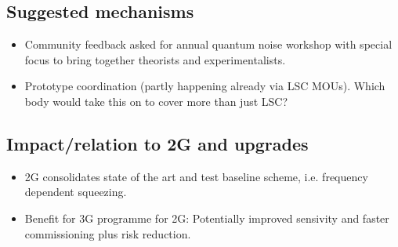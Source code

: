 \subsection{Suggested mechanisms}
\begin{itemize}
\item Community feedback asked for annual quantum noise workshop with special focus to bring together theorists and experimentalists. 
\item Prototype coordination (partly happening already via LSC MOUs). Which body would take this on to cover more than just LSC?
\end{itemize}
\subsection{Impact/relation to 2G and upgrades}
\begin{itemize}
\item 2G consolidates state of the art and test baseline scheme, i.e. frequency
dependent squeezing. 
\item Benefit for 3G programme for 2G: Potentially improved sensivity and faster commissioning plus risk reduction.
\end{itemize}
